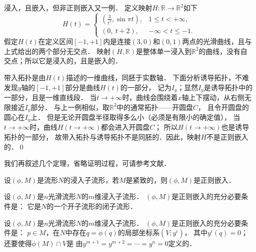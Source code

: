 \begin{example}\label{chdm:exm_iec3}
    浸入，且嵌入，但非正则嵌入又一例．
    定义映射$H:\mathbb{R}\to \mathbb{R}^2$如下
    \begin{equation}
        H(t)=\begin{cases}
           \left(\frac{3}{t^2},\sin\pi t \right), & 1 \leqslant t < +\infty, \\
           \left(0,\ t+2\right), & -\infty < t \leqslant -1.
        \end{cases}
    \end{equation}
    假定$H(t)$在定义区间$[-1,+1]$内是连接$(3,0)$和$(0,1)$两点的光滑曲线，且与上式给出的两个部分无交点．
    映射$(H,\mathbb{R})$是整体单一浸入到$\mathbb{R}^2$的曲线，没有自交点；所以它是浸入的，且是嵌入的．
    
    带入拓扑是由$H(t)$描述的一维曲线，同胚于实数轴．
    下面分析诱导拓扑，不难发现$y$轴的$[-1,+1]$部分是曲线$H(t)$的一部分，
    记为$I_y$；显然$I_y$是诱导拓扑中的一部分，且是一维直线段．
    当$t\to +\infty$时，曲线会围绕着$x$轴上下摆动，从右侧无限接近$I_y$部分．
    与上一例相似，取$\mathbb{R}^2$中的通常拓扑——开圆盘$C$，
    且令开圆盘的圆心在$I_y$上．
    但是无论开圆盘半径取得多么小（必须是有限小的确定值），
    当$t\to +\infty$时，曲线$H(t\to +\infty)$都会进入开圆盘$C$；
    所以$H(t\to +\infty)$也是诱导拓扑的一部分，
    故带入拓扑与诱导拓扑不是同胚的．因此，映射$H$不是正则嵌入的．\qed
\end{example}

我们再叙述几个定理，省略证明过程，可请参考文献\parencite[\S 1.3]{cc2001-zh}．
\begin{theorem}\label{chdm:thm_embed-1}
    设$(\phi,M)$是流形$N$的浸入子流形，若$M$是紧致的，则$(\phi,M)$是正则嵌入．
\end{theorem}

\begin{theorem}\label{chdm:thm_embed-2}
    设$(\phi,M)$是$n$光滑流形$N$的$m$维浸入子流形．
    $(\phi,M)$是正则嵌入的充分必要条件是：
    它是$N$的一个开子流形的闭子流形．
\end{theorem}

\begin{theorem}\label{chdm:thm_embed-3}
    设$(\phi,M)$是$n$光滑流形$N$的$m$维浸入子流形．
    $(\phi,M)$是正则嵌入的充分必要条件是：
    $p\in M$，在$N$中存在$q=\phi(q)$的局部坐标系$(V;y^i)$，
    其中$y^i(q)=0$；还要使得$\phi(M)\cap V$是
    由$y^{m+1}=y^{m+2}=\cdots=y^{n}=0$定义的．
\end{theorem}

